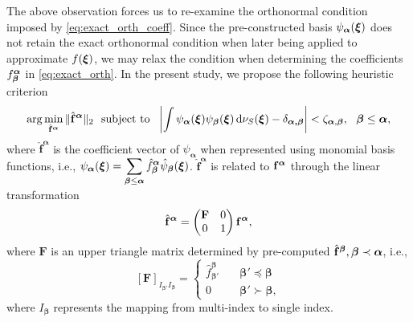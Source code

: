 The above observation forces us to re-examine the orthonormal condition imposed by \eqref{eq:exact_orth_coeff}.
Since the pre-constructed basis $\psi_{\bm\alpha}(\bm\xi)$ does not retain the exact orthonormal condition when later being applied to approximate $f(\bm\xi)$, we may relax the condition when determining the coefficients $f_{\bm\beta}^{\bm\alpha}$ in \eqref{eq:exact_orth}.
In the present study, we propose the following heuristic criterion 
\begin{equation}
  \arg\min_{\hat{\mathbf{f}}^{\bm\alpha}} \Vert \hat{\mathbf{f}}^{\bm\alpha}\Vert_2~~\mbox{subject to}~~ \left \vert \int \psi_{\bm{\alpha}}(\bm{\xi}) \psi_{\bm{\beta}}(\bm{\xi}) \,\mathrm{d} \nu_{S}(\bm\xi) - \delta_{\bm{\alpha,\beta}}\right \vert < \zeta_{\bm\alpha,\bm\beta},~~ \bm{\beta} \le \bm{\alpha},
  \label{eq:near_orth_condition}
\end{equation}
where $\hat{\mathbf{f}}^{\bm\alpha}$ is the coefficient vector of $\psi_{\bm\alpha}$ when represented using monomial basis functions, i.e., $\displaystyle \psi_{\bm\alpha}(\bm\xi) = \sum_{\bm\beta \le \bm\alpha} \hat{f}_{\bm\beta}^{\bm\alpha} \hat{\psi}_{\bm\beta}(\bm\xi)$.  $\hat{\mathbf{f}}^{\bm\alpha}$ is related to $\mathbf{f}^{\bm\alpha}$ through the linear transformation
\begin{equation}
  \hat{\mathbf{f}}^{\bm\alpha} =
  \begin{pmatrix}
    \mathbf{F} & 0 \\
    0 & 1
  \end{pmatrix}
  \mathbf{f}^{\bm\alpha},
  \label{eq:coeff_transform}  
\end{equation}
where $\mathbf{F}$ is an upper triangle matrix determined by pre-computed $\hat{\mathbf{f}}^{\bm\beta}, \bm\beta \prec \bm\alpha$, i.e.,
\begin{equation}
  \left[\mathbf{F}\right]_{I_{\bm\beta'} I_{\bm\beta}} = 
  \begin{cases}
    \hat{f}_{\bm\beta'}^{\bm\beta} \quad &\bm\beta' \preceq \bm\beta \\
    0 \quad  &\bm\beta' \succ \bm\beta,
  \end{cases}
\end{equation}
where $I_{\bm\beta}$ represents the mapping from multi-index to single index.

